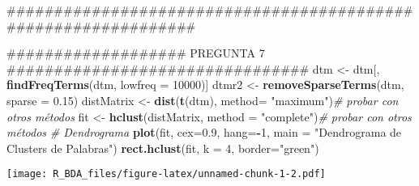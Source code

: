 \documentclass[]{article}
\newenvironment{Shaded}{\begin{snugshade}}{\end{snugshade}}
\newcommand{\KeywordTok}[1]{\textcolor[rgb]{0.13,0.29,0.53}{\textbf{#1}}}
\newcommand{\DataTypeTok}[1]{\textcolor[rgb]{0.13,0.29,0.53}{#1}}
\newcommand{\DecValTok}[1]{\textcolor[rgb]{0.00,0.00,0.81}{#1}}
\newcommand{\FloatTok}[1]{\textcolor[rgb]{0.00,0.00,0.81}{#1}}
\newcommand{\StringTok}[1]{\textcolor[rgb]{0.31,0.60,0.02}{#1}}
\newcommand{\CommentTok}[1]{\textcolor[rgb]{0.56,0.35,0.01}{\textit{#1}}}
\newcommand{\OperatorTok}[1]{\textcolor[rgb]{0.81,0.36,0.00}{\textbf{#1}}}
\newcommand{\NormalTok}[1]{#1}
\begin{document}
\begin{Shaded}
\begin{Highlighting}[]
\NormalTok{###############################################################}

\NormalTok{################### PREGUNTA 7 ################################}
\NormalTok{dtm <-}\StringTok{ }\NormalTok{dtm[, }\KeywordTok{findFreqTerms}\NormalTok{(dtm, }\DataTypeTok{lowfreq =} \DecValTok{10000}\NormalTok{)]}
\NormalTok{dtmr2 <-}\StringTok{ }\KeywordTok{removeSparseTerms}\NormalTok{(dtm, }\DataTypeTok{sparse =} \FloatTok{0.15}\NormalTok{)}
\NormalTok{distMatrix <-}\StringTok{ }\KeywordTok{dist}\NormalTok{(}\KeywordTok{t}\NormalTok{(dtm), }\DataTypeTok{method=} \StringTok{"maximum"}\NormalTok{)}\CommentTok{# probar con otros métodos}
\NormalTok{fit <-}\StringTok{ }\KeywordTok{hclust}\NormalTok{(distMatrix, }\DataTypeTok{method =} \StringTok{"complete"}\NormalTok{)}\CommentTok{# probar con otros métodos}
\CommentTok{# Dendrograma}
\KeywordTok{plot}\NormalTok{(fit, }\DataTypeTok{cex=}\FloatTok{0.9}\NormalTok{, }\DataTypeTok{hang=}\OperatorTok{-}\DecValTok{1}\NormalTok{, }\DataTypeTok{main =} \StringTok{"Dendrograma de Clusters de Palabras"}\NormalTok{)}
\KeywordTok{rect.hclust}\NormalTok{(fit, }\DataTypeTok{k =} \DecValTok{4}\NormalTok{, }\DataTypeTok{border=}\StringTok{"green"}\NormalTok{) }
\end{Highlighting}
\end{Shaded}

\texttt{[image: R\_BDA\_files/figure-latex/unnamed-chunk-1-2.pdf]}
\end{document}
